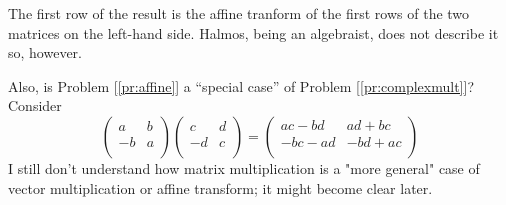 \documentclass[english,notitlepage,smartquotes]{hgbreport}
\theoremstyle{definition}
\theoremstyle{problem}
\theoremstyle{remark}
\theoremstyle{plain}
\begin{document}
The first row of the result is the affine tranform of the first rows of the two matrices on the left-hand side. Halmos, being an algebraist, does not describe it so, however. 

Also, is Problem [\ref{pr:affine}] a ``special case'' of Problem [\ref{pr:complexmult}]?
Consider
\[
  \begin{pmatrix}
    a & b\\
    -b & a\\
  \end{pmatrix}
  \begin{pmatrix}
    c & d\\
    -d & c\\
  \end{pmatrix}
  =
  \begin{pmatrix}
    ac-bd & ad+bc\\
    -bc-ad &-bd+ac\\
  \end{pmatrix}
\]
I still don't understand how matrix multiplication is a "more general" case of vector multiplication or affine transform; it might become clear later.
\MakeBibliography[nosplit]

\end{document}
